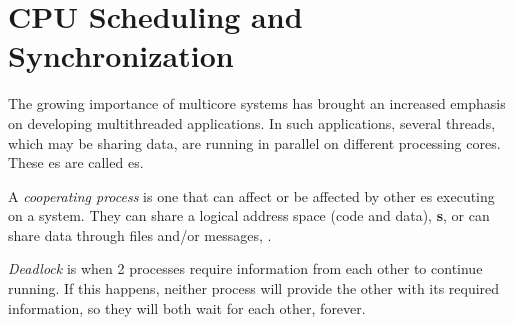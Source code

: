 \section{CPU Scheduling and Synchronization}\label{sec:CPU_Scheduling_Synchronization}
The growing importance of multicore systems has brought an increased emphasis on developing multithreaded applications.
In such applications, several threads, which may be sharing data, are running in parallel on different processing cores.
These es are called es.

\begin{definition}\label{def:Cooperating_Process}
  A \emph{cooperating process} is one that can affect or be affected by other es executing on a system.
  They can share a logical address space (code and data), \textbf{s}, or can share data through files and/or messages, \textbf{}.
\end{definition}


\begin{definition}[Deadlock]\label{def:Deadlock}
  \emph{Deadlock} is when 2 processes require information from each other to continue running.
  If this happens, neither process will provide the other with its required information, so they will both wait for each other, forever.
\end{definition}

